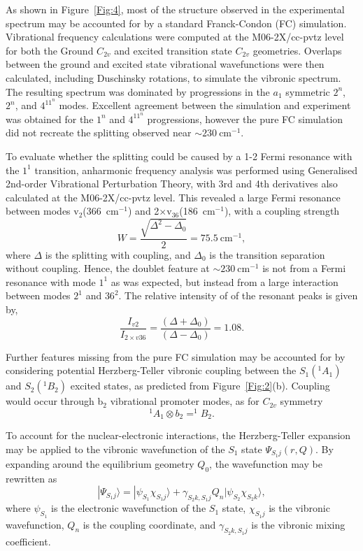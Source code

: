 \documentclass[journal=jpcafh,manuscript=article,layout=onecolumn, 12pt]{achemso}
\begin{document}
As shown in Figure~\ref{Fig:4}, most of the structure observed in the experimental spectrum may be accounted for by a standard Franck-Condon (FC) simulation. Vibrational frequency calculations were computed at the M06-2X/cc-pvtz level for both the Ground $C_{2v}$ and excited transition state $C_{2v}$ geometries. Overlaps between the ground and excited state vibrational wavefunctions were then calculated, including Duschinsky rotations, to simulate the vibronic spectrum. The resulting spectrum was dominated by progressions in the $a_1$ symmetric $2^n$, $2^n$, and $4^11^n$ modes. Excellent agreement between the simulation and experiment was obtained for the $1^n$ and $4^11^n$ progressions, however the pure FC simulation did not recreate the splitting observed near $\sim230~$cm$^{-1}$. 

To evaluate whether the splitting could be caused by a 1-2 Fermi resonance with the $1^1$ transition, anharmonic frequency analysis was performed using Generalised 2nd-order Vibrational Perturbation Theory, with 3rd and 4th derivatives also calculated at the M06-2X/cc-pvtz level. This revealed a large Fermi resonance between modes v$_2$(366~cm$^{-1}$) and 2$\times$v$_{36}$(186~cm$^{-1}$), with a coupling strength
\begin{equation}
W = \frac{\sqrt{\Delta^2-\Delta_0}}{2} =75.5~\text{cm}^{-1},
\end{equation} 
where $\Delta$ is the splitting with coupling, and $\Delta_0$ is the transition separation without coupling. Hence, the doublet feature at $\sim230~$cm$^{-1}$ is not from a Fermi resonance with mode $1^1$ as was expected, but instead from a large interaction between modes $2^1$ and $36^2$. The relative intensity of of the resonant peaks is given by,
\begin{equation}
\frac{I_{v2}}{I_{2\times v36}} = \frac{\left(\Delta+\Delta_0\right)}{\left(\Delta-\Delta_0\right)}=1.08.
\end{equation}

Further features missing from the pure FC simulation may be accounted for by considering potential Herzberg-Teller vibronic coupling between the $S_1(^1A_1)$ and $S_2(^1B_2)$ excited states, as predicted from Figure~\ref{Fig:2}(b). Coupling would occur through b$_2$ vibrational promoter modes, as for $C_{2v}$ symmetry
\begin{equation}
^1A_1 \otimes b_2 = ^1B_2.
\end{equation}

To account for the nuclear-electronic interactions, the Herzberg-Teller expansion may be applied to the vibronic wavefunction of the $S_1$ state $\Psi_{S_1j}(r,Q)$. By expanding around the equilibrium geometry $Q_0$, the wavefunction may be rewritten as 
\begin{equation}
|\Psi_{S_1j} \rangle = |\psi_{S_1} \chi_{S_1j} \rangle + \gamma_{S_2k,S_1j}Q_n|\psi_{S_2} \chi_{S_2k}\rangle, 
\label{eq:shorthand}
\end{equation}
where $\psi_{S_1}$ is the electronic wavefunction of the $S_1$ state, $\chi_{S_1j}$ is the vibronic wavefunction, $Q_n$ is the coupling coordinate, and $\gamma_{S_2k,S_1j}$ is the vibronic mixing coefficient.
\end{document}
